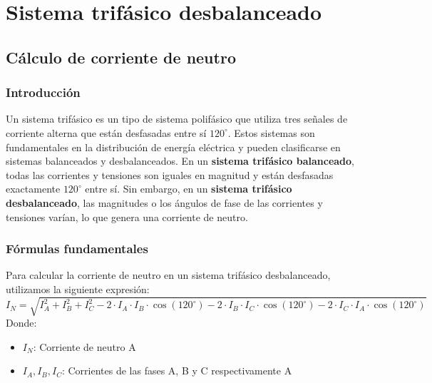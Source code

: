 \documentclass[../main]{subfiles}
\begin{document}
\chapter{Sistema trif\'asico{} desbalanceado}
\section{C\'alculo{} de corriente de neutro}
\subsection{Introducci\'on{}}
Un sistema trif\'asico{} es un tipo de sistema polif\'asico{} que utiliza tres se\~nales{} de corriente alterna que est\'an{} desfasadas entre s\'i{} $120^\circ$. Estos sistemas son fundamentales en la distribuci\'on{} de energ\'ia{} el\'ectrica{} y pueden clasificarse en sistemas balanceados y desbalanceados. En un \textbf{sistema trif\'asico{} balanceado}, todas las corrientes y tensiones son iguales en magnitud y est\'an{} desfasadas exactamente $120^\circ$ entre s\'i{}. Sin embargo, en un \textbf{sistema trif\'asico{} desbalanceado}, las magnitudes o los \'angulos{} de fase de las corrientes y tensiones var\'ian{}, lo que genera una corriente de neutro.


\subsection{F\'ormulas{} fundamentales}
Para calcular la corriente de neutro en un sistema trif\'asico{} desbalanceado, utilizamos la siguiente expresi\'on{}:
\begin{equation}
I_N = \sqrt{I_A^2 + I_B^2 + I_C^2 - 2 \cdot I_A \cdot I_B \cdot \cos(120^\circ) - 2 \cdot I_B \cdot I_C \cdot \cos(120^\circ) - 2 \cdot I_C \cdot I_A \cdot \cos(120^\circ)}
\end{equation}
Donde:
\begin{itemize}
\item $I_N$: Corriente de neutro \unit{A}
\item $I_A, I_B, I_C$: Corrientes de las fases A, B y C respectivamente \unit{A}
\end{itemize}
\end{document}
